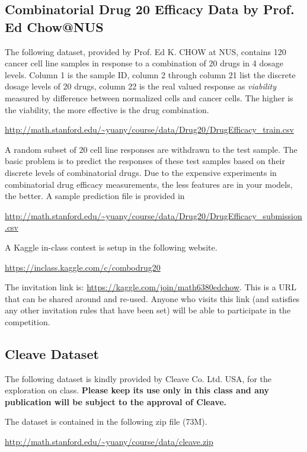 \documentclass[11pt]{article}
\begin{document}
\subsection{Combinatorial Drug 20 Efficacy Data by Prof. Ed Chow@NUS}
The following dataset, provided by Prof. Ed K. CHOW at NUS, contains 120 cancer cell line samples in response to a combination of 20 drugs in 4 dosage levels. Column 1 is the sample ID, column 2 through column 21 list the discrete dosage levels of 20 drugs, column 22 is the real valued response as \emph{viability} measured by difference between normalized cells and cancer cells. The higher is the viability, the more effective is the drug combination. 
\begin{center}
\url{http://math.stanford.edu/~yuany/course/data/Drug20/DrugEfficacy_train.csv}
\end{center}
A random subset of 20 cell line responses are withdrawn to the test sample. The basic problem is to predict the responses of these test samples based on their discrete levels of combinatorial drugs. Due to the expensive experiments in combinatorial drug efficacy measurements, the less features are in your models, the better. A sample prediction file is provided in 
\begin{center}
\url{http://math.stanford.edu/~yuany/course/data/Drug20/DrugEfficacy_submission.csv}
\end{center}
A Kaggle in-class contest is setup in the following website. 
\begin{center}
\url{https://inclass.kaggle.com/c/combodrug20}
\end{center}
The invitation link is: \url{https://kaggle.com/join/math6380edchow}. This is a URL that can be shared around and re-used.
Anyone who visits this link (and satisfies any other invitation rules that have been set) will be able to participate in the competition.

\subsection{Cleave Dataset}
The following dataset is kindly provided by Cleave Co. Ltd. USA, for the exploration on class. {\textbf{Please keep its use only in this class and any publication will be subject to the approval of Cleave.}}

The dataset is contained in the following zip file (73M).

\url{http://math.stanford.edu/~yuany/course/data/cleave.zip}
\end{document}
